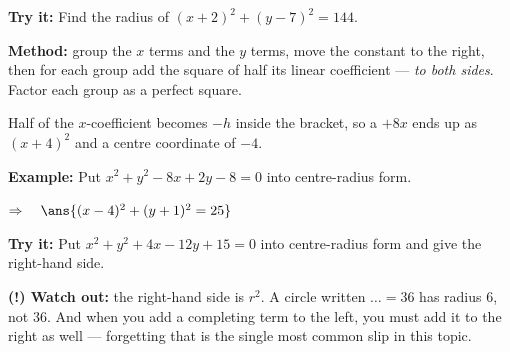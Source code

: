 \documentclass[12pt]{article}
\begin{document}
\begin{tryitbox}
\textbf{Try it:} \quad Find the radius of $(x+2)^2 + (y-7)^2 = 144$.\\[2pt]
\end{tryitbox}


\begin{formulabox}
\textbf{Method:} group the $x$ terms and the $y$ terms, move the constant to the right, then for each group add the square of half its linear coefficient --- \emph{to both sides}. Factor each group as a perfect square.\par
Half of the $x$-coefficient becomes $-h$ inside the bracket, so a $+8x$ ends up as $(x+4)^2$ and a centre coordinate of $-4$.
\end{formulabox}

\begin{examplebox}
\textbf{Example:} \quad Put $x^2 + y^2 - 8x + 2y - 8 = 0$ into centre-radius form.

$\Rightarrow\quad \ans{(x-4)^2 + (y+1)^2 = 25}$
\end{examplebox}

\begin{tryitbox}
\textbf{Try it:} \quad Put $x^2 + y^2 + 4x - 12y + 15 = 0$ into centre-radius form and give the right-hand side.\\[2pt]
\end{tryitbox}

\begin{watchoutbox}
\textbf{(!) Watch out:} the right-hand side is $r^2$. A circle written $\ldots = 36$ has radius $6$, not $36$. And when you add a completing term to the left, you must add it to the right as well --- forgetting that is the single most common slip in this topic.
\end{watchoutbox}
\end{document}
